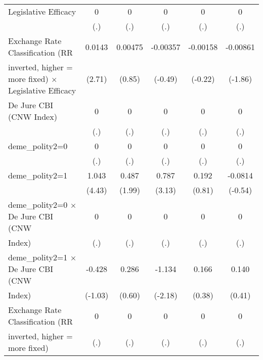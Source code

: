 {\begin{tabular}{l*{5}{c}}
\addlinespace
Legislative Efficacy                    &    0         &    0         &    0         &    0         &    0         \\
                                        &  (.)         &  (.)         &  (.)         &  (.)         &  (.)         \\
\addlinespace
Exchange Rate Classification (RR        &0.0143\sym{**} &0.00475         &-0.00357         &-0.00158         &-0.00861         \\
inverted, higher = more fixed) $\times$ Legislative Efficacy&(2.71)         &(0.85)         &(-0.49)         &(-0.22)         &(-1.86)         \\
\addlinespace
De Jure CBI (CNW Index)                 &    0         &    0         &    0         &    0         &    0         \\
                                        &  (.)         &  (.)         &  (.)         &  (.)         &  (.)         \\
\addlinespace
deme\_polity2=0                          &    0         &    0         &    0         &    0         &    0         \\
                                        &  (.)         &  (.)         &  (.)         &  (.)         &  (.)         \\
\addlinespace
deme\_polity2=1                          &1.043\sym{***}&0.487\sym{*}  &0.787\sym{**} &0.192         &-0.0814         \\
                                        &(4.43)         &(1.99)         &(3.13)         &(0.81)         &(-0.54)         \\
\addlinespace
deme\_polity2=0 $\times$ De Jure CBI (CNW&    0         &    0         &    0         &    0         &    0         \\
Index)                                  &  (.)         &  (.)         &  (.)         &  (.)         &  (.)         \\
\addlinespace
deme\_polity2=1 $\times$ De Jure CBI (CNW&-0.428         &0.286         &-1.134\sym{*}  &0.166         &0.140         \\
Index)                                  &(-1.03)         &(0.60)         &(-2.18)         &(0.38)         &(0.41)         \\
\addlinespace
Exchange Rate Classification (RR        &    0         &    0         &    0         &    0         &    0         \\
inverted, higher = more fixed)          &  (.)         &  (.)         &  (.)         &  (.)         &  (.)         \\

\end{tabular}}
